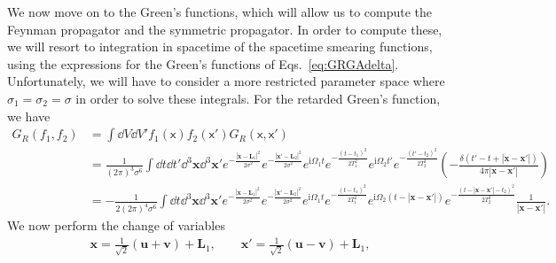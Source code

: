 \documentclass[letterpaper,12pt,titlepage,oneside,final]{book}
\newcommand{\mf}{\mathsf}%
\newcommand{\ii}{\mathrm{i}}
\begin{document}
We now move on to the Green's functions, which will allow us to compute the Feynman propagator and the symmetric propagator. In order to compute these, we will resort to integration in spacetime of the spacetime smearing functions, using the expressions for the Green's functions of Eqs.~\eqref{eq:GRGAdelta}. Unfortunately, we will have to consider a more restricted parameter space where $\sigma_1 = \sigma_2 = \sigma$ in order to solve these integrals. For the retarded Green's function, we have{\footnotesize
\begin{align}
    G_R(f_1,f_2) &= \int \dd V\dd V' f_1(\mf x) f_2(\mf x') G_R(\mf x,\mf x')\\
    & = \frac{1}{(2\pi)^3 \sigma^6} \int \dd t \dd t' \dd^3\bm x \dd^3 \bm x' e^{- \frac{|\bm x - \bm L_1|^2}{2\sigma^2}}e^{- \frac{|\bm x' - \bm L_2|^2}{2\sigma^2}} e^{\ii \Omega_1 t} e^{- \frac{(t-t_1)^2}{2T_1^2}}e^{\ii \Omega_2 t'} e^{- \frac{(t'-t_2)^2}{2T_2^2}}\left(- \frac{\delta(t' - t + |\bm x - \bm x'|)}{4\pi|\bm x-\bm x'|} \right)\nonumber\\
    & = -\frac{1}{2(2\pi)^4 \sigma^6} \int \dd t  \dd^3\bm x \dd^3 \bm x' e^{- \frac{|\bm x - \bm L_1|^2}{2\sigma^2}}e^{- \frac{|\bm x' - \bm L_2|^2}{2\sigma^2}} e^{\ii \Omega_1 t} e^{- \frac{(t-t_1)^2}{2T_1^2}}e^{\ii \Omega_2 (t - |\bm x - \bm x'|)} e^{- \frac{(t - |\bm x - \bm x'|-t_2)^2}{2T_2^2}}\frac{1}{|\bm x - \bm x'|}.\nonumber
\end{align}}
We now perform the change of variables
\begin{align}
    \bm x = \frac{1}{\sqrt{2}}(\bm u +\bm v) + \bm L_1, \quad\quad
    \bm x' = \frac{1}{\sqrt{2}}(\bm u -\bm v) + \bm L_1,
\end{align}
\end{document}
